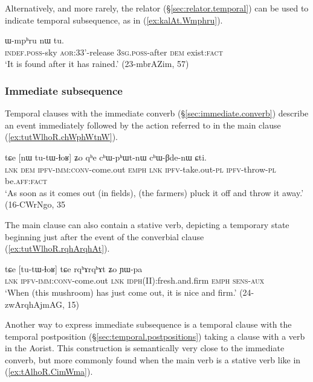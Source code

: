 Alternatively, and more rarely, the relator  (§\ref{sec:relator.temporal}) can be used to indicate temporal subsequence, as in (\ref{ex:kalAt.Wmphru}). 

 \begin{exe}
\ex \label{ex:kalAt.Wmphru}
\gll [tɯ-mɯ ka-lɤt] ɯ-mpʰru nɯ tu.    \\
 \textsc{indef}.\textsc{poss}-sky \textsc{aor}:3\fl{}3'-release 3\textsc{sg}.\textsc{poss}-after \textsc{dem} exist:\textsc{fact} \\
\glt  `It is found after it has rained.' (23-mbrAZim, 57)
\end{exe}

  
 \subsubsection{Immediate subsequence} \label{sec:immediate.subsequence}
Temporal clauses with the immediate converb (§\ref{sec:immediate.converb}) describe an event immediately followed by the action referred to in the main clause (\ref{ex:tutWlhoR.chWphWtnW}).
 
\begin{exe}
\ex \label{ex:tutWlhoR.chWphWtnW} 
\gll   tɕe [nɯ tu-tɯ-ɬoʁ] ʑo qʰe cʰɯ-pʰɯt-nɯ cʰɯ-βde-nɯ ɕti. \\
\textsc{lnk} \textsc{dem} \textsc{ipfv}-\textsc{imm}:\textsc{conv}-come.out \textsc{emph} \textsc{lnk} \textsc{ipfv}-take.out-\textsc{pl} \textsc{ipfv}-throw-\textsc{pl} be.\textsc{aff}:\textsc{fact} \\
\glt `As soon as it comes out (in fields), (the farmers) pluck it off and throw it away.' (16-CWrNgo, 35
 \end{exe}  
  
The main clause can also contain a stative verb, depicting a temporary state beginning just after the event of the converbial clause (\ref{ex:tutWlhoR.rqhArqhAt}).
 
\begin{exe}
\ex \label{ex:tutWlhoR.rqhArqhAt} 
\gll tɕe [tu-tɯ-ɬoʁ] tɕe rqʰɤrqʰɤt ʑo ɲɯ-pa  \\
\textsc{lnk} \textsc{ipfv}-\textsc{imm}:\textsc{conv}-come.out \textsc{lnk} \textsc{idph}(II):fresh.and.firm \textsc{emph} \textsc{sens}-\textsc{aux} \\
\glt `When (this mushroom) has just come out, it is nice and firm.' (24-zwArqhAjmAG, 15)
  \end{exe}  
  
Another way to express immediate subsequence is a temporal clause with the temporal postposition  (§\ref{sec:temporal.postpositions}) taking a clause with a verb in the Aorist. This construction is semantically very close to the immediate converb, but more commonly found when the main verb is a stative verb like  in (\ref{ex:tAlhoR.CimWma}).
 
